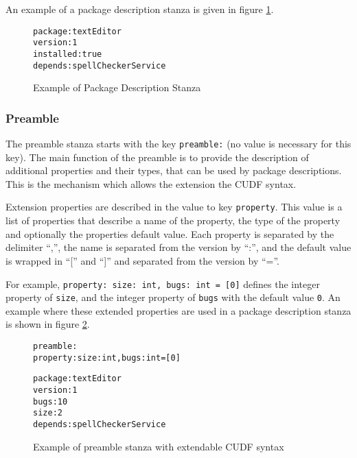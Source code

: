 An example of a package description stanza is given in figure \ref{formal.cudfpdstanza}.
\begin{figure}[htp] 
\begin{center}
\begin{alltt}
package: textEditor
version: 1
installed: true
depends: spellCheckerService
\end{alltt}
  \caption{Example of Package Description Stanza}
  \label{formal.cudfpdstanza}
\end{center}
\end{figure}

\subsubsection{Preamble}
\label{cudf.preambledes}
The preamble stanza starts with the key \verb+preamble:+ (no value is necessary for this key).
The main function of the preamble is to provide the description of additional properties and their types, that can be used by package descriptions.
This is the mechanism which allows the extension the CUDF syntax.

Extension properties are described in the value to key \verb+property+.
This value is a list of properties that describe a name of the property, the type of the property and optionally the properties default value.
Each property is separated by the delimiter ``,'', the name is separated from the version by ``:'', and the default value is wrapped in ``['' and ``]'' and separated from the version by ``=''.

For example, \verb+property: size: int, bugs: int = [0]+ defines the integer property of \verb+size+, and the integer property of \verb+bugs+ with the default value \verb+0+.
An example where these extended properties are used in a package description stanza is shown in figure \ref{formal.cudfextensionexample}.

\begin{figure}[htp] 
\begin{center}
\begin{alltt}
preamble:
property: size: int, bugs: int = [0]

package: textEditor
version: 1
bugs: 10
size: 2
depends: spellCheckerService

\end{alltt}
  \caption{Example of preamble stanza with extendable CUDF syntax}
  \label{formal.cudfextensionexample}
\end{center}
\end{figure}

